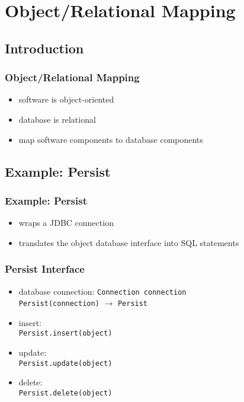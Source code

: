 \documentclass[dvipsnames]{beamer}
\theoremstyle{plain}
\begin{document}
\section{Object/Relational Mapping}

\subsection{Introduction}

\begin{frame}
  \frametitle{Object/Relational Mapping}

  \begin{itemize}
    \item software is object-oriented
    \item database is relational
    \item map software components to database components
  \end{itemize}
\end{frame}

\subsection{Example: Persist}

\begin{frame}
  \frametitle{Example: Persist}

  \begin{itemize}
    \item wraps a JDBC connection
    \item translates the object database interface into SQL statements
  \end{itemize}
\end{frame}

\begin{frame}
  \frametitle{Persist Interface}

  \begin{itemize}
    \item database connection: \lstinline!Connection connection!\\
      \lstinline!Persist(connection)! $\rightarrow$ \lstinline!Persist!

    \pause
    \medskip
    \item insert:\\
      \lstinline!Persist.insert(object)!
    \item update:\\
      \lstinline!Persist.update(object)!
    \item delete:\\
      \lstinline!Persist.delete(object)!
  \end{itemize}
\end{frame}
\end{document}
